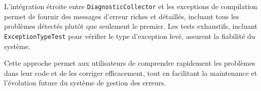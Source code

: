 L'intégration étroite entre \texttt{DiagnosticCollector} et les exceptions de compilation permet de fournir des messages d'erreur riches et détaillés, incluant tous les problèmes détectés plutôt que seulement le premier.
Les tests exhaustifs, incluant \texttt{ExceptionTypeTest} pour vérifier le type d'exception levé, assurent la fiabilité du système.

Cette approche permet aux utilisateurs de comprendre rapidement les problèmes dans leur code et de les corriger efficacement, tout en facilitant la maintenance et l'évolution future du système de gestion des erreurs.
